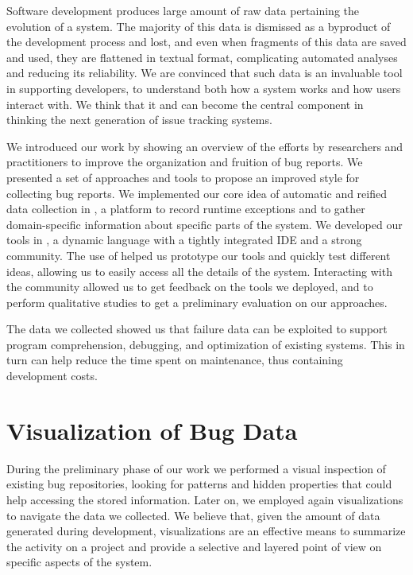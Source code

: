 


Software development produces large amount of raw data pertaining the evolution of a system.
The majority of this data is dismissed as a byproduct of the development process and lost, and even when fragments of this data are saved and used, they are flattened in textual format, complicating automated analyses and reducing its reliability.
We are convinced that such data is an invaluable tool in supporting developers, to understand both how a system works and how users interact with.
We think that it and can become the central component in thinking the next generation of issue tracking systems.

We introduced our work by showing an overview of the efforts by researchers and practitioners to improve the organization and fruition of bug reports.
We presented a set of approaches and tools to propose an improved style for collecting bug reports.
We implemented our core idea of automatic and reified data collection in \sln, a platform to record runtime exceptions and to gather domain-specific information about specific parts of the system.
We developed our tools in \pha, a dynamic language with a tightly integrated IDE and a strong community.
The use of \pha helped us prototype our tools and quickly test different ideas, allowing us to easily access all the details of the system.
Interacting with the \pha community allowed us to get feedback on the tools we deployed, and to perform qualitative studies to get a preliminary evaluation on our approaches.

The data we collected showed us that failure data can be exploited to support program comprehension, debugging, and optimization of existing systems.
This in turn can help reduce the time spent on maintenance, thus containing development costs.


\section{Visualization of Bug Data}

During the preliminary phase of our work we performed a visual inspection of existing bug repositories, looking for patterns and hidden properties that could help accessing the stored information.
Later on, we employed again visualizations to navigate the data we collected.
We believe that, given the amount of data generated during development, visualizations are an effective means to summarize the activity on a project and provide a selective and layered point of view on specific aspects of the system.


